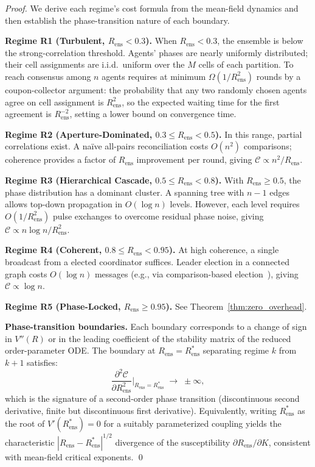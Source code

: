 \documentclass[twocolumn,10pt]{article}
\newcommand{\Rens}{R_{\mathrm{ens}}}
\begin{document}
\begin{proof}
We derive each regime's cost formula from the mean-field dynamics and then
establish the phase-transition nature of each boundary.

\medskip
\noindent\textbf{Regime R1 (Turbulent, $\Rens < 0.3$).}
When $\Rens < 0.3$, the ensemble is below the strong-correlation threshold.
Agents' phases are nearly uniformly distributed; their cell assignments are
i.i.d.\ uniform over the $M$ cells of each partition. To reach consensus among
$n$ agents requires at minimum $\Omega(1/\Rens^2)$ rounds by a coupon-collector
argument: the probability that any two randomly chosen agents agree on cell
assignment is $\Rens^2$, so the expected waiting time for the first agreement
is $\Rens^{-2}$, setting a lower bound on convergence time.

\medskip
\noindent\textbf{Regime R2 (Aperture-Dominated, $0.3 \leq \Rens < 0.5$).}
In this range, partial correlations exist. A na{\"i}ve all-pairs reconciliation
costs $O(n^2)$ comparisons; coherence provides a factor of $\Rens$ improvement
per round, giving $\mathcal{C} \propto n^2/\Rens$.

\medskip
\noindent\textbf{Regime R3 (Hierarchical Cascade, $0.5 \leq \Rens < 0.8$).}
With $\Rens \geq 0.5$, the phase distribution has a dominant cluster. A
spanning tree with $n-1$ edges allows top-down propagation in $O(\log n)$
levels. However, each level requires $O(1/\Rens^2)$ pulse exchanges to
overcome residual phase noise, giving $\mathcal{C} \propto n\log n/\Rens^2$.

\medskip
\noindent\textbf{Regime R4 (Coherent, $0.8 \leq \Rens < 0.95$).}
At high coherence, a single broadcast from a elected coordinator suffices.
Leader election in a connected graph costs $O(\log n)$ messages (e.g., via
comparison-based election~\cite{Lynch1996}), giving $\mathcal{C} \propto
\log n$.

\medskip
\noindent\textbf{Regime R5 (Phase-Locked, $\Rens \geq 0.95$).}
See Theorem~\ref{thm:zero_overhead}.

\medskip
\noindent\textbf{Phase-transition boundaries.}
Each boundary corresponds to a change of sign in $V''(R)$ or in the leading
coefficient of the stability matrix of the reduced order-parameter ODE. The
boundary at $\Rens = \Rens^*$ separating regime $k$ from $k+1$ satisfies:
\[
  \frac{\partial^2 \mathcal{C}}{\partial \Rens^2}\bigg|_{\Rens = \Rens^*} \;\to\; \pm\infty,
\]
which is the signature of a second-order phase transition (discontinuous
second derivative, finite but discontinuous first derivative). Equivalently,
writing $\Rens^*$ as the root of $V'(\Rens^*) = 0$ for a suitably parameterized
coupling yields the characteristic $|\Rens - \Rens^*|^{1/2}$ divergence of
the susceptibility $\partial\Rens/\partial K$, consistent with mean-field
critical exponents. \qed
\end{proof}
\end{document}

